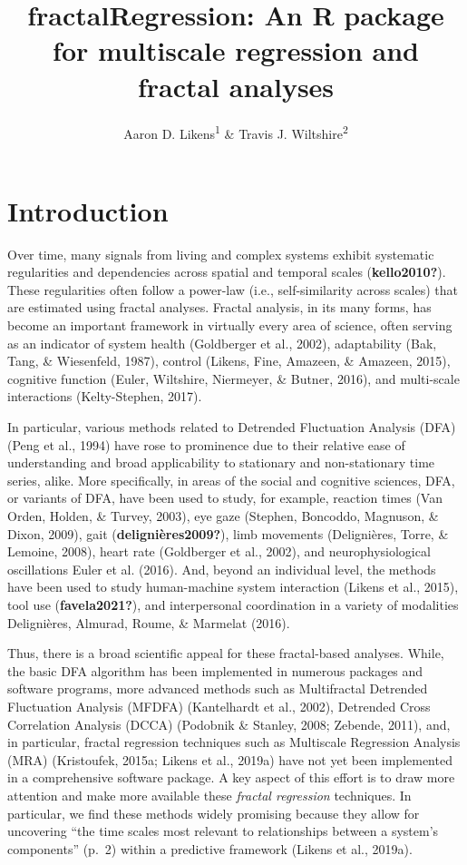\documentclass[
  man]{apa6}
\title{fractalRegression: An R package for multiscale regression and fractal analyses}
\author{Aaron D. Likens\textsuperscript{1} \& Travis J. Wiltshire\textsuperscript{2}}
\date{}
\affiliation{\vspace{0.5cm}\textsuperscript{1} Department of Biomechanics, University of Nebraska at Omaha\\\textsuperscript{2} Department of Cognitive Science \& Artificial Intelligence, Tilburg University}
\begin{document}
\maketitle

\hypertarget{introduction}{%
\section{Introduction}\label{introduction}}

Over time, many signals from living and complex systems exhibit
systematic regularities and dependencies across spatial and temporal
scales (\textbf{kello2010?}). These regularities often follow a power-law (i.e.,
self-similarity across scales) that are estimated using fractal
analyses. Fractal analysis, in its many forms, has become an important
framework in virtually every area of science, often serving as an
indicator of system health (Goldberger et al., 2002),
adaptability (Bak, Tang, \& Wiesenfeld, 1987), control
(Likens, Fine, Amazeen, \& Amazeen, 2015), cognitive function
(Euler, Wiltshire, Niermeyer, \& Butner, 2016), and multi-scale interactions
(Kelty-Stephen, 2017).

In particular, various methods related to Detrended Fluctuation Analysis
(DFA) (Peng et al., 1994) have rose to prominence due to
their relative ease of understanding and broad applicability to
stationary and non-stationary time series, alike. More specifically, in
areas of the social and cognitive sciences, DFA, or variants of DFA,
have been used to study, for example, reaction times
(Van Orden, Holden, \& Turvey, 2003), eye gaze
(Stephen, Boncoddo, Magnuson, \& Dixon, 2009), gait
(\textbf{delignières2009?}), limb movements
(Delignières, Torre, \& Lemoine, 2008), heart rate
(Goldberger et al., 2002), and neurophysiological
oscillations Euler et al. (2016). And, beyond an individual level,
the methods have been used to study human-machine system interaction
(Likens et al., 2015), tool use
(\textbf{favela2021?}), and
interpersonal coordination in a variety of modalities
Delignières, Almurad, Roume, \& Marmelat (2016).

Thus, there is a broad scientific appeal for these fractal-based
analyses. While, the basic DFA algorithm has been implemented in
numerous packages and software programs, more advanced methods such as
Multifractal Detrended Fluctuation Analysis (MFDFA)
(Kantelhardt et al., 2002), Detrended Cross
Correlation Analysis (DCCA)
(Podobnik \& Stanley, 2008; Zebende, 2011), and, in particular,
fractal regression techniques such as Multiscale Regression Analysis
(MRA) (Kristoufek, 2015a; Likens et al., 2019a) have not yet been
implemented in a comprehensive software package. A key aspect of this
effort is to draw more attention and make more available these \emph{fractal
regression} techniques. In particular, we find these methods widely
promising because they allow for uncovering ``the time scales most
relevant to relationships between a system's components'' (p.~2) within a
predictive framework (Likens et al., 2019a).
\end{document}
